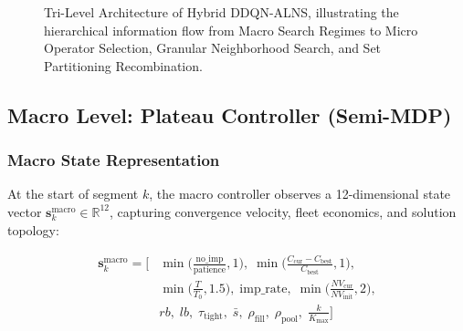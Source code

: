 \begin{figure}[!t]
\centering
{}
\caption{Tri-Level Architecture of Hybrid DDQN-ALNS, illustrating the hierarchical information flow from Macro Search Regimes to Micro Operator Selection, Granular Neighborhood Search, and Set Partitioning Recombination.}
\label{fig:architecture}
\end{figure}

\subsection{Macro Level: Plateau Controller (Semi-MDP)}
\label{sec:macro_controller}

\subsubsection{Macro State Representation}
At the start of segment $k$, the macro controller observes a 12-dimensional state vector $\mathbf{s}_k^{\text{macro}} \in \mathbb{R}^{12}$, capturing convergence velocity, fleet economics, and solution topology:

\begin{align}  \mathbf{s}_k^{\text{macro}} = \Big[ 
    &\min\Big(\frac{\text{no\_imp}}{\text{patience}}, 1\Big), \;
    \min\Big(\frac{C_{\text{cur}} - C_{\text{best}}}{C_{\text{best}}}, 1\Big), \nonumber \\
    &\min\Big(\frac{T}{T_0}, 1.5\Big), \;
    \text{imp\_rate}, \;
    \min\Big(\frac{NV_{\text{cur}}}{NV_{\text{init}}}, 2\Big), \nonumber \\
    &rb, \; lb, \; \tau_{\text{tight}}, \; \bar{s}, \; \rho_{\text{fill}}, \; \rho_{\text{pool}}, \; \frac{k}{K_{\max}}
  \Big]
  \label{eq:macro_state}
\end{align}

